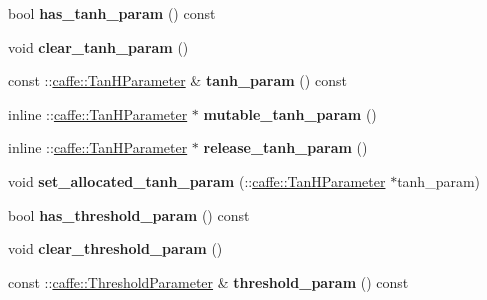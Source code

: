 \begin{DoxyCompactItemize}
bool {\bfseries has\+\_\+tanh\+\_\+param} () const
\item 
\mbox{\label{classcaffe_1_1_v1_layer_parameter_a8c50a7cbb8f6baa502431063b7c71af3}} 
void {\bfseries clear\+\_\+tanh\+\_\+param} ()
\item 
\mbox{\label{classcaffe_1_1_v1_layer_parameter_a0d3fdfb46aa3a68b16816794ee95e4c1}} 
const \+::\mbox{\hyperlink{classcaffe_1_1_tan_h_parameter}{caffe\+::\+Tan\+H\+Parameter}} \& {\bfseries tanh\+\_\+param} () const
\item 
\mbox{\label{classcaffe_1_1_v1_layer_parameter_afaf5e289307d0b0260231a95dfe2730b}} 
inline \+::\mbox{\hyperlink{classcaffe_1_1_tan_h_parameter}{caffe\+::\+Tan\+H\+Parameter}} $\ast$ {\bfseries mutable\+\_\+tanh\+\_\+param} ()
\item 
\mbox{\label{classcaffe_1_1_v1_layer_parameter_a3262bbe33466c6d1b174b73abc61fca2}} 
inline \+::\mbox{\hyperlink{classcaffe_1_1_tan_h_parameter}{caffe\+::\+Tan\+H\+Parameter}} $\ast$ {\bfseries release\+\_\+tanh\+\_\+param} ()
\item 
\mbox{\label{classcaffe_1_1_v1_layer_parameter_a94a46fe14dc33248ffcab02cfb3df6ed}} 
void {\bfseries set\+\_\+allocated\+\_\+tanh\+\_\+param} (\+::\mbox{\hyperlink{classcaffe_1_1_tan_h_parameter}{caffe\+::\+Tan\+H\+Parameter}} $\ast$tanh\+\_\+param)
\item 
\mbox{\label{classcaffe_1_1_v1_layer_parameter_ab2514e8a4b3a735e7c3e076681692eb4}} 
bool {\bfseries has\+\_\+threshold\+\_\+param} () const
\item 
\mbox{\label{classcaffe_1_1_v1_layer_parameter_a8b65c2f335f8eaa22d2804ae51f3e776}} 
void {\bfseries clear\+\_\+threshold\+\_\+param} ()
\item 
\mbox{\label{classcaffe_1_1_v1_layer_parameter_aae35cf31b93031f1d475c2204a5a5e53}} 
const \+::\mbox{\hyperlink{classcaffe_1_1_threshold_parameter}{caffe\+::\+Threshold\+Parameter}} \& {\bfseries threshold\+\_\+param} () const

\end{DoxyCompactItemize}
